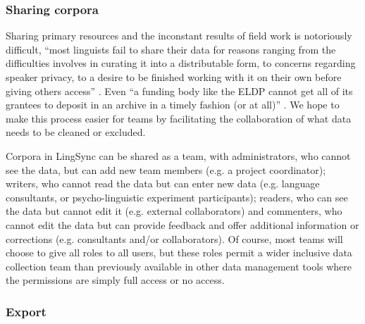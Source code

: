 \documentclass[letterpaper, 12pt, dvips]{mitwpl}
\begin{document}
\subsubsection{Sharing corpora}
\label{sec:sharingactivityfeeds}

Sharing primary resources and the inconstant results of field work is notoriously difficult, 
``most linguists fail to share their data for reasons ranging from the difficulties involves in curating it into a distributable form, to concerns regarding speaker privacy, to a desire to be finished working with it on their own before giving others access'' \citep{Bender:2010}. Even ``a funding body like the ELDP cannot get all of its grantees to deposit in an archive in a timely fashion (or at all)'' \citep{Thieberger:2012}. We hope to make this process easier  for teams by facilitating the collaboration of what data needs to be cleaned or excluded.


Corpora in LingSync can be shared as a team,
with administrators,
who cannot see the data,
but can add new team members (e.g.
a project coordinator); writers,
who cannot read the data but can enter new data (e.g.
language consultants,
or psycho-linguistic experiment participants); readers,
who can see the data but cannot edit it (e.g.
external collaborators) and commenters,
 who cannot edit the data but can provide feedback and offer additional information or corrections (e.g.
consultants and/or collaborators).
 Of course,
most teams will choose to give all roles to all users,
but these roles permit a wider inclusive data collection team than previously available  in other data management tools where the permissions are simply full access or no access.

\subsubsection{Export}
\end{document}
